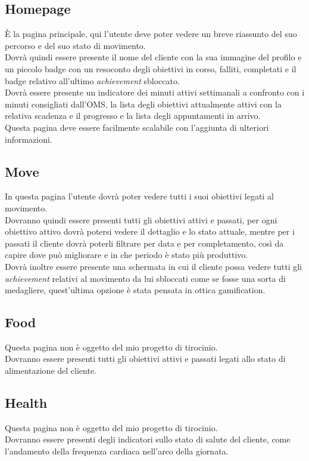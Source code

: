 \subsection{Homepage}
È la pagina principale, qui l'utente deve poter vedere un breve riassunto del suo percorso e del suo stato di movimento.\\
Dovrà quindi essere presente il nome del cliente con la sua immagine del profilo e un piccolo badge con un resoconto degli obiettivi in corso, falliti, completati e il badge relativo all'ultimo \textit{achievement} sbloccato.\\
Dovrà essere presente un indicatore dei minuti attivi settimanali a confronto con i minuti consigliati dall'OMS, la lista degli obiettivi attualmente attivi con la relativa scadenza e il progresso e la lista degli appuntamenti in arrivo.\\
Questa pagina deve essere facilmente scalabile con l'aggiunta di ulteriori informazioni.
\subsection{Move}
In questa pagina l'utente dovrà poter vedere tutti i suoi obiettivi legati al movimento.\\
Dovranno quindi essere presenti tutti gli obiettivi attivi e passati, per ogni obiettivo attivo dovrà potersi vedere il dettaglio e lo stato attuale, mentre per i passati il cliente dovrà poterli filtrare per data e per completamento, così da capire dove può migliorare e in che periodo è stato più produttivo.\\
Dovrà inoltre essere presente una schermata in cui il cliente possa vedere tutti gli \textit{achievement} relativi al movimento da lui sbloccati come se fosse una sorta di medagliere, quest'ultima opzione è stata pensata in ottica \gls{gamification}. 
\subsection{Food}
Questa pagina non è oggetto del mio progetto di tirocinio.\\
Dovranno essere presenti tutti gli obiettivi attivi e passati legati allo stato di alimentazione del cliente.\\
\subsection{Health}
Questa pagina non è oggetto del mio progetto di tirocinio.\\
Dovranno essere presenti degli indicatori sullo stato di salute del cliente, come l'andamento della frequenza cardiaca nell'arco della giornata.
